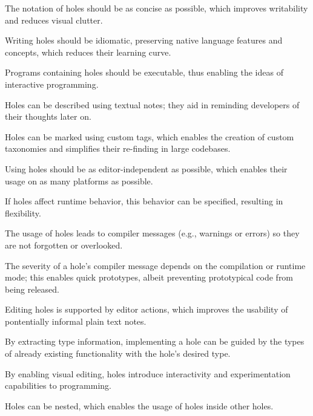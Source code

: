 \begin{properties}
    \item The notation of holes should be as concise as possible, which improves writability and reduces visual clutter.\label{hp:concise}
    \item Writing holes should be idiomatic, preserving native language features and concepts, which reduces their learning curve.\label{hp:idiomatic}
    \item Programs containing holes should be executable, thus enabling the ideas of interactive programming.\label{hp:executable}
    \item Holes can be described using textual notes; they aid in reminding developers of their thoughts later on.\label{hp:prose-message}
    \item Holes can be marked using custom tags, which enables the creation of custom taxonomies and simplifies their re-finding in large codebases.\label{hp:taggable}
    \item Using holes should be as editor-independent as possible, which enables their usage on as many platforms as possible.\label{hp:editor-independence}
    \item If holes affect runtime behavior, this behavior can be specified, resulting in flexibility.\label{hp:runtime-behavior}
    \item The usage of holes leads to compiler messages (e.g., warnings or errors) so they are not forgotten or overlooked.\label{hp:compile-warnings}
    \item The severity of a hole's compiler message depends on the compilation or runtime mode; this enables quick prototypes, albeit preventing prototypical code from being released.\label{hp:severity-modes}
    \item Editing holes is supported by editor actions, which improves the usability of pontentially informal plain text notes.\label{hp:supported-editor-actions}
    \item By extracting type information, implementing a hole can be guided by the types of already existing functionality with the hole's desired type.\label{hp:matchable-via-types}
    \item By enabling visual editing, holes introduce interactivity and experimentation capabilities to programming.\label{hp:visually-editable}
    \item Holes can be nested, which enables the usage of holes inside other holes.\label{hp:nestable}
\end{properties}
